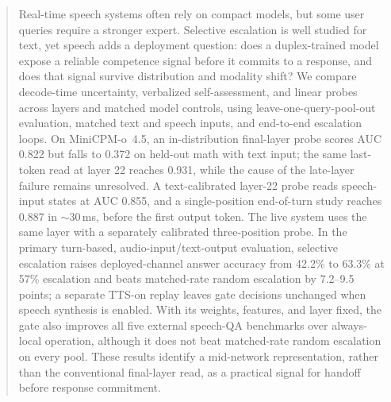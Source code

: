 \begin{abstract}
Real-time speech systems often rely on compact models, but some user
queries require a stronger expert. Selective escalation is well studied
for text, yet speech adds a deployment question: does a duplex-trained
model expose a reliable competence signal before it commits to a
response, and does that signal survive distribution and modality shift?
We compare decode-time uncertainty, verbalized self-assessment, and
linear probes across layers and matched model controls, using
leave-one-query-pool-out evaluation, matched text and speech inputs,
and end-to-end escalation loops. On MiniCPM-o~4.5, an in-distribution
final-layer probe scores AUC 0.822 but falls to 0.372 on held-out math
with text input; the same last-token read at layer 22 reaches 0.931,
while the cause of the late-layer failure remains unresolved. A
text-calibrated layer-22 probe reads speech-input states at AUC 0.855,
and a single-position end-of-turn study reaches 0.887 in
$\sim$30\,ms, before the first output token. The live system uses the
same layer with a separately calibrated three-position probe. In the
primary turn-based, audio-input/text-output evaluation, selective
escalation raises deployed-channel answer accuracy from 42.2\% to
63.3\% at 57\% escalation and beats matched-rate random escalation by
7.2--9.5 points; a separate TTS-on replay leaves gate decisions
unchanged when speech synthesis is enabled. With its weights, features,
and layer fixed, the gate also
improves all five external speech-QA benchmarks over always-local
operation, although it does not beat matched-rate random escalation on
every pool. These results identify a mid-network representation, rather
than the conventional final-layer read, as a practical signal for
handoff before response commitment.
\end{abstract}
